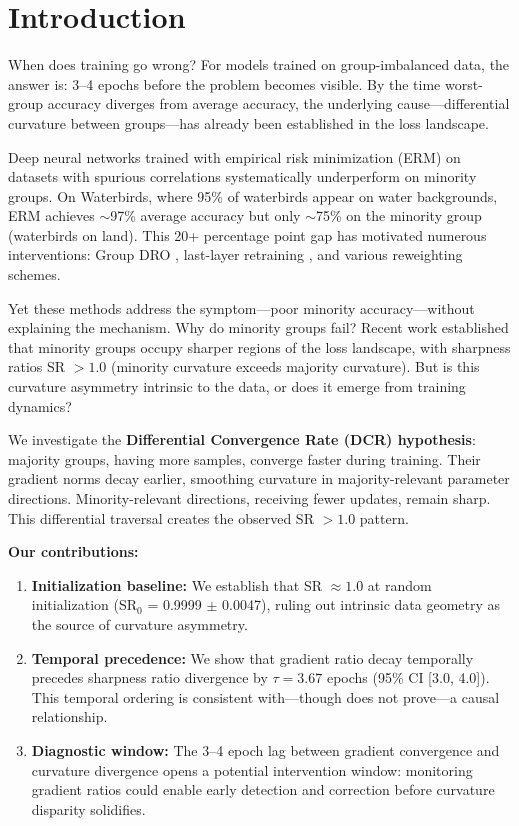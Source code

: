 \section{Introduction}

When does training go wrong? For models trained on group-imbalanced data, the answer is: 3--4 epochs before the problem becomes visible. By the time worst-group accuracy diverges from average accuracy, the underlying cause---differential curvature between groups---has already been established in the loss landscape.

Deep neural networks trained with empirical risk minimization (ERM) on datasets with spurious correlations systematically underperform on minority groups. On Waterbirds, where 95\% of waterbirds appear on water backgrounds, ERM achieves $\sim$97\% average accuracy but only $\sim$75\% on the minority group (waterbirds on land). This 20+ percentage point gap has motivated numerous interventions: Group DRO \cite{sagawa2020distributionally}, last-layer retraining \cite{kirichenko2023last}, and various reweighting schemes.

Yet these methods address the symptom---poor minority accuracy---without explaining the mechanism. Why do minority groups fail? Recent work established that minority groups occupy sharper regions of the loss landscape, with sharpness ratios SR $> 1.0$ (minority curvature exceeds majority curvature). But is this curvature asymmetry intrinsic to the data, or does it emerge from training dynamics?

We investigate the \textbf{Differential Convergence Rate (DCR) hypothesis}: majority groups, having more samples, converge faster during training. Their gradient norms decay earlier, smoothing curvature in majority-relevant parameter directions. Minority-relevant directions, receiving fewer updates, remain sharp. This differential traversal creates the observed SR $> 1.0$ pattern.

\textbf{Our contributions:}

\begin{enumerate}
    \item \textbf{Initialization baseline:} We establish that SR $\approx 1.0$ at random initialization (SR$_0$ = 0.9999 $\pm$ 0.0047), ruling out intrinsic data geometry as the source of curvature asymmetry.

    \item \textbf{Temporal precedence:} We show that gradient ratio decay temporally precedes sharpness ratio divergence by $\tau = 3.67$ epochs (95\% CI [3.0, 4.0]). This temporal ordering is consistent with---though does not prove---a causal relationship.

    \item \textbf{Diagnostic window:} The 3--4 epoch lag between gradient convergence and curvature divergence opens a potential intervention window: monitoring gradient ratios could enable early detection and correction before curvature disparity solidifies.
\end{enumerate}
